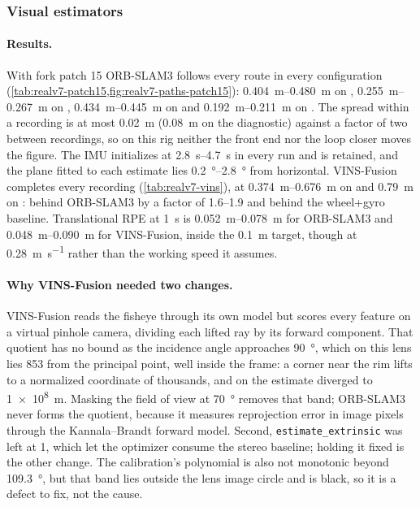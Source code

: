 \documentclass[11pt,a4paper,notitlepage]{report}
\begin{document}
\subsubsection{Visual estimators}

\paragraph{Results.} With fork patch 15 ORB-SLAM3 follows every route in
every configuration (\cref{tab:realv7-patch15,fig:realv7-paths-patch15}):
\SIrange{0.404}{0.480}{\metre} on ,
\SIrange{0.255}{0.267}{\metre} on \mbox{},
\SIrange{0.434}{0.445}{\metre} on  and
\SIrange{0.192}{0.211}{\metre} on . The spread within a  recording
is at most \SI{0.02}{\metre} (\SI{0.08}{\metre} on the  diagnostic)
against a factor of two between recordings, so on
this rig neither the front end nor the loop closer moves the figure. The IMU
initializes at \SIrange{2.8}{4.7}{\second} in every run and is retained, and
the plane fitted to each estimate lies \SIrange{0.2}{2.8}{\degree} from
horizontal. VINS-Fusion completes every recording (\cref{tab:realv7-vins}),
at \SIrange{0.374}{0.676}{\metre} on  and \SI{0.79}{\metre} on
: behind ORB-SLAM3 by a factor of \numrange{1.6}{1.9} and behind
the wheel+gyro baseline. Translational RPE at \SI{1}{\second} is
\SIrange{0.052}{0.078}{\metre} for ORB-SLAM3 and
\SIrange{0.048}{0.090}{\metre} for VINS-Fusion, inside the \SI{0.1}{\metre}
target, though at \SI{0.28}{\metre\per\second} rather than the working speed
it assumes. 

\paragraph{Why VINS-Fusion needed two changes.} VINS-Fusion reads the fisheye
through its own model but scores every feature on a virtual pinhole camera,
dividing each lifted ray by its forward component. That quotient has no bound
as the incidence angle approaches \SI{90}{\degree}, which on this lens lies
\SI{853}{\pixel} from the principal point, well inside the frame: a corner near
the rim lifts to a normalized coordinate of thousands, and on
 the estimate diverged to \SI{1e8}{\metre}. Masking the field
of view at \SI{70}{\degree} removes that band; ORB-SLAM3 never forms the
quotient, because it measures reprojection error in image pixels through the
Kannala--Brandt forward model. Second, \texttt{estimate\_extrinsic} was left at
1, which let the optimizer consume the stereo baseline; holding it fixed is the
other change. The calibration's polynomial is also not monotonic beyond
\SI{109.3}{\degree}, but that band lies outside the lens image circle and is
black, so it is a defect to fix, not the cause.
\end{document}
